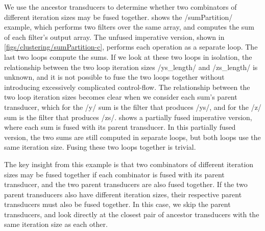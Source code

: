 We use the ancestor transducers to determine whether two combinators of different iteration sizes may be fused together.
 shows the \Hs/sumPartition/ example, which performs two filters over the same array, and computes the sum of each filter's output array.
The unfused imperative version, shown in \cref{figs/clustering/sumPartition-c}, performs each operation as a separate loop.
The last two loops compute the sums.
If we look at these two loops in isolation, the relationship between the two loop iteration sizes \Hs/ys_length/ and \Hs/zs_length/ is unknown, and it is not possible to fuse the two loops together without introducing excessively complicated control-flow.
The relationship between the two loop iteration sizes becomes clear when we consider each sum's parent transducer, which for the \Hs/y/ sum is the filter that produces \Hs/ys/, and for the \Hs/z/ sum is the filter that produces \Hs/zs/.
 shows a partially fused imperative version, where each sum is fused with its parent transducer.
In this partially fused version, the two sums are still computed in separate loops, but both loops use the same iteration size.
Fusing these two loops together is trivial.

The key insight from this example is that two combinators of different iteration sizes may be fused together if each combinator is fused with its parent transducer, and the two parent transducers are also fused together.
If the two parent transducers also have different iteration sizes, their respective parent transducers must also be fused together.
In this case, we skip the parent transducers, and look directly at the closest pair of ancestor transducers with the same iteration size as each other.


